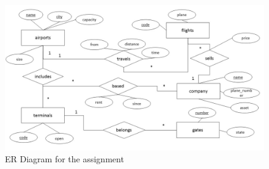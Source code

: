 \documentclass[10pt,a4paper]{article}
\begin{document}
\begin{figure}
	\centering
	\includegraphics[scale = 0.42]{img/erd_assignment3}
	\caption{ER Diagram for the assignment}
	\label{fig:erd}
\end{figure}
\end{document}
